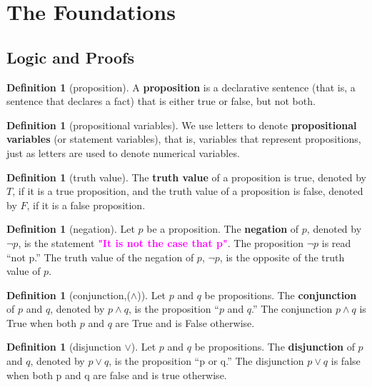 \documentclass[letterpaper,10pt]{article}
\theoremstyle{plain}
\theoremstyle{definition}
\newtheorem{defn}[thm]{Definition}
\theoremstyle{remark}
\providecommand{\land}{\ensuremath{\wedge}}
\providecommand{\lor}{\ensuremath{\vee}}
\providecommand{\todo}[1]{\textcolor{magenta}{\textbf{#1}}}
\begin{document}
\pagestyle{fancy}

\section{The Foundations}
\subsection{Logic and Proofs}

\begin{defn}[proposition]
A \textbf{proposition} is a declarative sentence (that is, a sentence that declares a fact) that is either true
or false, but not both.
\end{defn}

\begin{defn}[propositional variables]
We use letters to denote \textbf{propositional variables} (or statement variables), that is, variables that represent propositions, just as letters are used to denote numerical variables.
\end{defn}
\begin{defn}[truth value] The \textbf{truth value} of a proposition is true, denoted by $T$, if it is a true proposition, and the truth value of a proposition
is false, denoted by $F$, if it is a false proposition.
\end{defn}

\begin{defn}[negation]
Let $p$ be a proposition. The \textbf{negation} of $p$, denoted by $ \lnot p$, is the statement 
\newline\todo{"It is not the case that p"}. 
\newline The proposition $\lnot p$ is read “not p.” The truth value of the negation of $p$, $\lnot p$, is the opposite of the truth value of $p$.
\end{defn}


\begin{defn}[conjunction,($\land$)]
Let $p$ and $q$ be propositions. The \textbf{conjunction} of $p$ and $q$, denoted by $p \land q$, is the proposition
“$p$ and $q$.” The conjunction $p \land q$ is True when both $p$ and $q$ are True and is False otherwise.
\end{defn}



\begin{defn}[disjunction $\lor$]
Let $p$ and $q$ be propositions. The \textbf{disjunction} of $p$ and $q$, denoted by $p \lor q$, is the proposition
“p or q.” The disjunction $p \lor q$ is false when both p and q are false and is true otherwise.
\end{defn}
\end{document}
